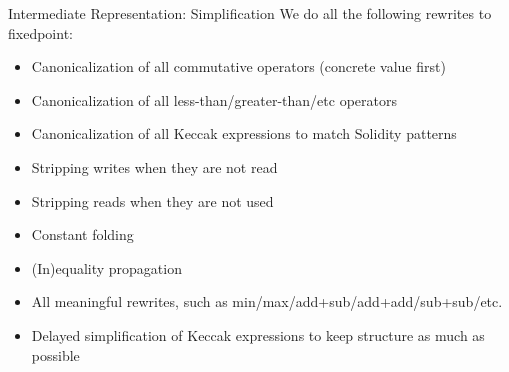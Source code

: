 \documentclass[aspectratio=169]{beamer}
\begin{document}
\begin{frame}[fragile=singleslide]{Intermediate Representation: Simplification} 
We do all the following rewrites to fixedpoint:
\begin{itemize}
\item Canonicalization of all commutative operators (concrete value first)
\item Canonicalization of all less-than/greater-than/etc operators
\item Canonicalization of all Keccak expressions to match Solidity patterns
\item Stripping writes when they are not read
\item Stripping reads when they are not used
\item Constant folding
\item (In)equality propagation
\item All meaningful rewrites, such as min/max/add+sub/add+add/sub+sub/etc.
\item Delayed simplification of Keccak expressions to keep structure as much as possible
\end{itemize}
\end{frame}

%

%
\end{document}
